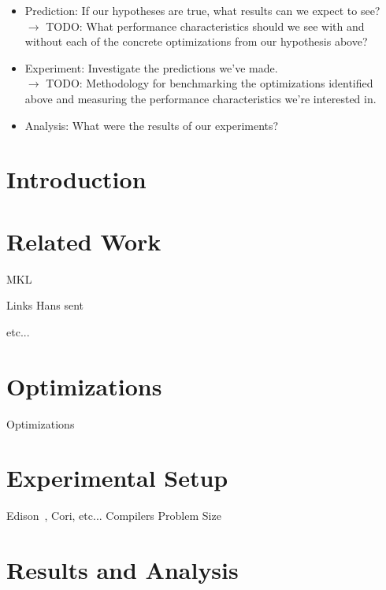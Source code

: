 \documentclass[conference]{IEEEtran}
\begin{document}
\begin{itemize}
\item Prediction: If our hypotheses are true, what results can we expect to
see? \\
$\rightarrow$ TODO: What performance characteristics should we see with and
without each of the concrete optimizations from our hypothesis above?

\item Experiment: Investigate the predictions we've made. \\
$\rightarrow$ TODO: Methodology for benchmarking the optimizations identified
above and measuring the performance characteristics we're interested
in.

\item Analysis: What were the results of our experiments?
\end{itemize}
% 

\section{Introduction}
% 

\section{Related Work}
MKL

Links Hans sent

etc...

\section{Optimizations}
Optimizations

\section{Experimental Setup}
Edison~\cite{Edison_website}, Cori, etc...
Compilers
Problem Size

\section{Results and Analysis}

\end{document}
